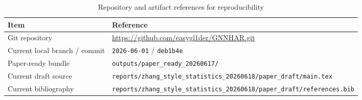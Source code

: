 
\begin{table}[H]
\centering
\caption{Repository and artifact references for reproducibility}
\label{tab:repo-artifacts}
\scriptsize
\begin{tabular}{ll}
\toprule
Item & Reference \\
\midrule
Git repository & \url{https://github.com/easygl1der/GNNHAR.git} \\
Current local branch / commit & \texttt{2026-06-01} / \texttt{deb1b4e} \\
Paper-ready bundle & \texttt{outputs/paper\_ready\_20260617/} \\
Current draft source & \texttt{reports/zhang\_style\_statistics\_20260618/paper\_draft/main.tex} \\
Current bibliography & \texttt{reports/zhang\_style\_statistics\_20260618/paper\_draft/references.bib} \\
\bottomrule
\end{tabular}
\end{table}
